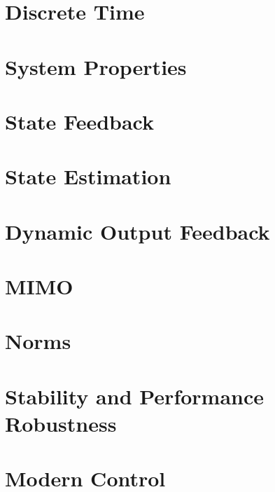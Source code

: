 \documentclass[numerate]{cheatsheet}
\author{Noa Sendlhofer - nsendlhofer@ethz.ch}
\begin{document}
\section{Discrete Time}
	
	
	
	
	
\section{System Properties}
	
	
	
	
	
\section{State Feedback}
	
	
\section{State Estimation}
	
	
\section{Dynamic Output Feedback}
	
\section{MIMO}
	
	
	
	
	
\section{Norms}
	
	
	
	
	\columnbreak
\section{Stability and Performance Robustness}
	
	
	
\section{Modern Control}
	
	
	
	
\end{document}
